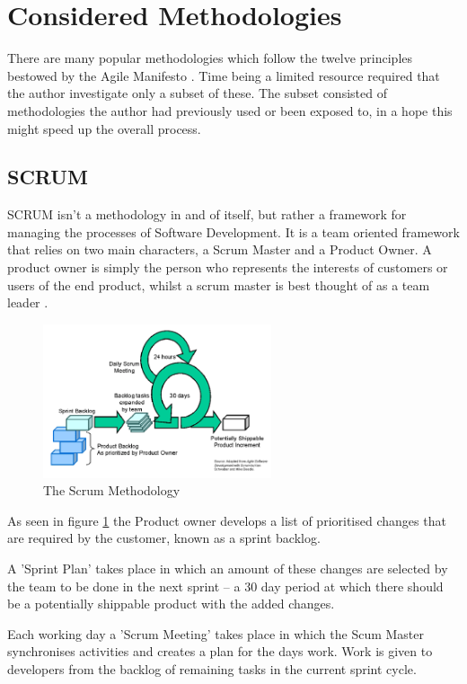\documentclass[11pt]{book}
\begin{document}
\section{Considered Methodologies}
There are many popular methodologies which follow the twelve principles bestowed by the Agile Manifesto \cite{agilemanifesto}. Time being a limited resource required that the author investigate only a subset of these. The subset consisted of methodologies the author had previously used or been exposed to, in a hope this might speed up the overall process.

\subsection{SCRUM}
SCRUM isn't a methodology in and of itself, but rather a framework for managing the processes of Software Development. It is a team oriented framework that relies on two main characters, a Scrum Master and a Product Owner. A product owner is simply the person who represents the interests of customers or users of the end product, whilst a scrum master is best thought of as a team leader \cite{thescrumguide}.
 
\begin{figure}[H]
	\centering
	\includegraphics[width=0.6\textwidth]{images/scrum}
	\caption{The Scrum Methodology \cite{scrumdiagram}}
	\label{fig:scrum}
\end{figure}

As seen in figure \ref{fig:scrum} the Product owner develops a list of prioritised changes that are required by the customer, known as a sprint backlog. 

A 'Sprint Plan' takes place in which an amount of these changes are selected by the team to be done in the next sprint -- a 30 day period at which there should be a potentially shippable product with the added changes.

Each working day a 'Scrum Meeting' takes place in which the Scum Master synchronises activities and creates a plan for the days work. Work is given to developers from the backlog of remaining tasks in the current sprint cycle.
\end{document}
